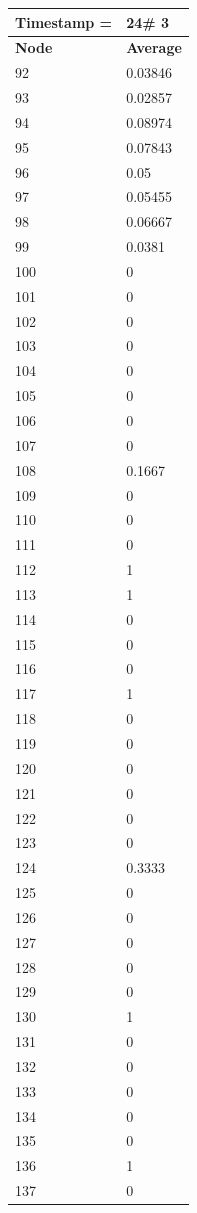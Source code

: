 \begin{tabular}{|l||l|}
\hline
\textbf{Timestamp =} & \textbf{24}\# 3\\\hline
	\textbf{Node} & \textbf{Average} \\ \hline
\hline
	92 & 0.03846 \\ \hline
	93 & 0.02857 \\ \hline
	94 & 0.08974 \\ \hline
	95 & 0.07843 \\ \hline
	96 & 0.05 \\ \hline
	97 & 0.05455 \\ \hline
	98 & 0.06667 \\ \hline
	99 & 0.0381 \\ \hline
	100 & 0 \\ \hline
	101 & 0 \\ \hline
	102 & 0 \\ \hline
	103 & 0 \\ \hline
	104 & 0 \\ \hline
	105 & 0 \\ \hline
	106 & 0 \\ \hline
	107 & 0 \\ \hline
	108 & 0.1667 \\ \hline
	109 & 0 \\ \hline
	110 & 0 \\ \hline
	111 & 0 \\ \hline
	112 & 1 \\ \hline
	113 & 1 \\ \hline
	114 & 0 \\ \hline
	115 & 0 \\ \hline
	116 & 0 \\ \hline
	117 & 1 \\ \hline
	118 & 0 \\ \hline
	119 & 0 \\ \hline
	120 & 0 \\ \hline
	121 & 0 \\ \hline
	122 & 0 \\ \hline
	123 & 0 \\ \hline
	124 & 0.3333 \\ \hline
	125 & 0 \\ \hline
	126 & 0 \\ \hline
	127 & 0 \\ \hline
	128 & 0 \\ \hline
	129 & 0 \\ \hline
	130 & 1 \\ \hline
	131 & 0 \\ \hline
	132 & 0 \\ \hline
	133 & 0 \\ \hline
	134 & 0 \\ \hline
	135 & 0 \\ \hline
	136 & 1 \\ \hline
	137 & 0 \\ \hline
\end{tabular}

